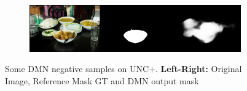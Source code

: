 \begin{figure}[!htbp]
    \begin{subfigure}[b]{\columnwidth}
            \centering
            \includegraphics[width=\textwidth]{./figures/unc_plus_samples/4_neg.png}
    \end{subfigure}
    \caption{Some DMN negative samples on UNC+. \textbf{Left-Right:} Original Image, Reference Mask GT and DMN output mask}
    \label{Fig:UNC+_Neg}
\end{figure}


\FloatBarrier
